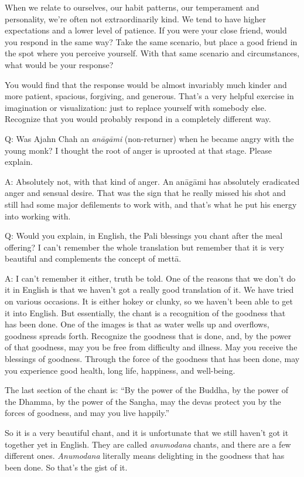 When we relate to ourselves, our habit patterns, our temperament and
personality, we’re often not extraordinarily kind. We tend to have
higher expectations and a lower level of patience. If you were your
close friend, would you respond in the same way? Take the same scenario,
but place a good friend in the spot where you perceive yourself. With
that same scenario and circumstances, what would be your response?

You would find that the response would be almost invariably much kinder
and more patient, spacious, forgiving, and generous. That’s a very
helpful exercise in imagination or visualization: just to replace
yourself with somebody else. Recognize that you would probably respond
in a completely different way.

\qaspace
Q: Was Ajahn Chah an \emph{anāgāmi} (non-returner) when he became angry
with the young monk? I thought the root of anger is uprooted at that
stage. Please explain.

\qaspace
A: Absolutely not, with that kind of anger. An anāgāmi has absolutely
eradicated anger and sensual desire. That was the sign that he really
missed his shot and still had some major defilements to work with, and
that’s what he put his energy into working with.

\qaspace
Q: Would you explain, in English, the Pali blessings you chant after the
meal offering? I can’t remember the whole translation but remember that
it is very beautiful and complements the concept of mettā.

\qaspace
A: I can’t remember it either, truth be told. One of the reasons that we
don’t do it in English is that we haven’t got a really good translation
of it. We have tried on various occasions. It is either hokey or clunky,
so we haven’t been able to get it into English. But essentially, the
chant is a recognition of the goodness that has been done. One of the
images is that as water wells up and overflows, goodness spreads forth.
Recognize the goodness that is done, and, by the power of that goodness,
may you be free from difficulty and illness. May you receive the
blessings of goodness. Through the force of the goodness that has been
done, may you experience good health, long life, happiness, and
well-being.

The last section of the chant is: “By the power of the Buddha, by the
power of the Dhamma, by the power of the Sangha, may the devas protect
you by the forces of goodness, and may you live happily.”

So it is a very beautiful chant, and it is unfortunate that we still
haven’t got it together yet in English. They are called \emph{anumodana}
chants, and there are a few different ones. \emph{Anumodana} literally
means delighting in the goodness that has been done. So that’s the gist
of it.

